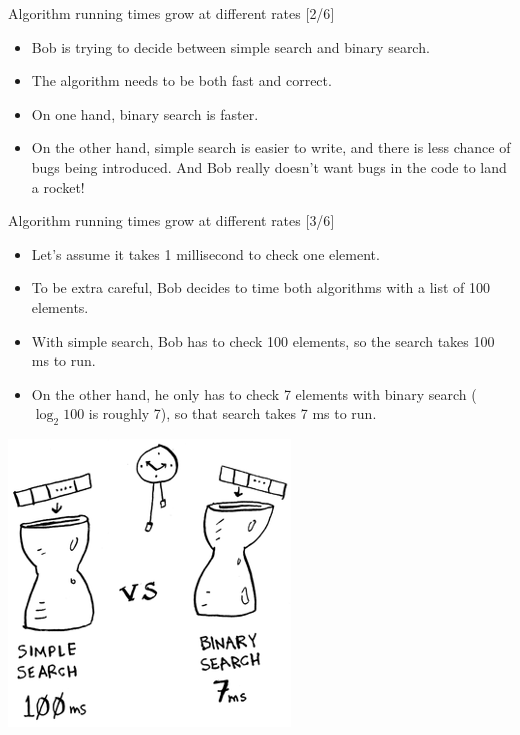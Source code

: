 \documentclass[ignorenonframetext,]{beamer}
\providecommand{\tightlist}{%
  \setlength{\itemsep}{0pt}\setlength{\parskip}{0pt}}
\begin{document}
\begin{frame}{Algorithm running times grow at different rates {[}2/6{]}}
\protect\hypertarget{algorithm-running-times-grow-at-different-rates-26}{}

\begin{itemize}
\tightlist
\item
  Bob is trying to decide between simple search and binary search.
\item
  The algorithm needs to be both fast and correct.
\item
  On one hand, binary search is faster.
\item
  On the other hand, simple search is easier to write, and there is less
  chance of bugs being introduced. And Bob really doesn't want bugs in
  the code to land a rocket!
\end{itemize}

\end{frame}

\begin{frame}{Algorithm running times grow at different rates {[}3/6{]}}
\protect\hypertarget{algorithm-running-times-grow-at-different-rates-36}{}

\begin{itemize}
\tightlist
\item
  Let's assume it takes 1 millisecond to check one element.
\item
  To be extra careful, Bob decides to time both algorithms with a list
  of 100 elements.
\item
  With simple search, Bob has to check 100 elements, so the search takes
  100 ms to run.
\item
  On the other hand, he only has to check 7 elements with binary search
  (\(\log_2 100\) is roughly 7), so that search takes 7 ms to run.
\end{itemize}

\includegraphics{./Chapter01-figure/rocket_simple_vs_binary_search.png}

\end{frame}
\end{document}
